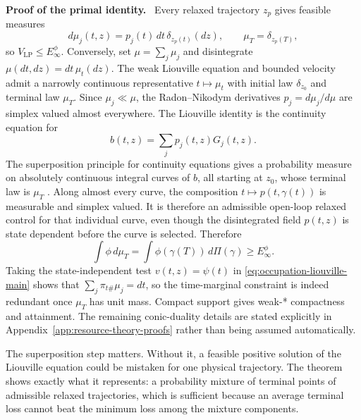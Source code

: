 \documentclass[twoside,11pt]{article}
\renewenvironment{proof}[1][Proof]{\par\noindent\textbf{#1.}\ }{\hfill\BlackBox\par\medskip}
\begin{document}
\begin{proof}[Proof of the primal identity]
Every relaxed trajectory $z_p$ gives feasible measures
\begin{equation}
 d\mu_j(t,z)=p_j(t)\,dt\,\delta_{z_p(t)}(dz),
 \qquad
 \mu_T=\delta_{z_p(T)},
 \label{eq:path-occupation-main}
\end{equation}
so $V_{\mathrm{LP}}\le E_\infty^\phi$.  Conversely, set $\mu=\sum_j\mu_j$ and disintegrate
$\mu(dt,dz)=dt\,\mu_t(dz)$.  The weak Liouville equation and bounded
velocity admit a narrowly continuous representative $t\mapsto\mu_t$ with
initial law $\delta_{z_0}$ and terminal law $\mu_T$.  Since $\mu_j\ll\mu$, the Radon--Nikodym derivatives $p_j=d\mu_j/d\mu$ are simplex valued almost everywhere.  The Liouville identity is the continuity equation for
\begin{equation}
 b(t,z)=\sum_jp_j(t,z)G_j(t,z).
 \label{eq:occupation-velocity-main}
\end{equation}
The superposition principle for continuity equations gives a probability measure on absolutely continuous integral curves of $b$, all starting at $z_0$, whose terminal law is $\mu_T$ \citep{AmbrosioGigliSavare2008}.  Along almost every curve, the composition $t\mapsto p(t,\gamma(t))$ is measurable and simplex valued.  It is therefore an admissible open-loop relaxed control for that individual curve, even though the disintegrated field $p(t,z)$ is state dependent before the curve is selected.  Therefore
\begin{equation}
 \int\phi\,d\mu_T
 =\int\phi(\gamma(T))\,d\Pi(\gamma)
 \ge E_\infty^\phi.
 \label{eq:occupation-superposition-main}
\end{equation}
Taking the state-independent test $v(t,z)=\psi(t)$ in \eqref{eq:occupation-liouville-main} shows that $\sum_j\pi_{t\#}\mu_j=dt$, so the time-marginal constraint is indeed redundant once $\mu_T$ has unit mass.  Compact support gives weak-* compactness and attainment.  The remaining conic-duality details are stated explicitly in Appendix~\ref{app:resource-theory-proofs} rather than being assumed automatically.
\end{proof}

The superposition step matters.  Without it, a feasible positive solution of the Liouville equation could be mistaken for one physical trajectory.  The theorem shows exactly what it represents: a probability mixture of terminal points of admissible relaxed trajectories, which is sufficient because an average terminal loss cannot beat the minimum loss among the mixture components.
\end{document}
